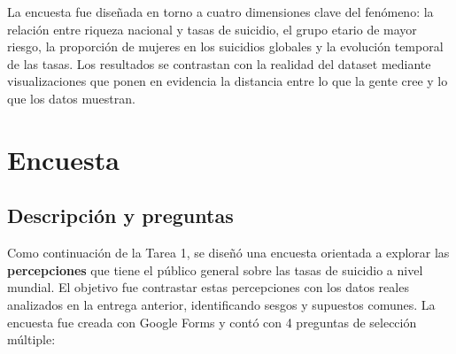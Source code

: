 \documentclass[12pt, letterpaper]{article}
\begin{document}
La encuesta fue diseñada en torno a cuatro dimensiones clave del fenómeno: la relación entre riqueza nacional y tasas de suicidio, el grupo etario de mayor riesgo, la proporción de mujeres en los suicidios globales y la evolución temporal de las tasas. Los resultados se contrastan con la realidad del dataset mediante visualizaciones que ponen en evidencia la distancia entre lo que la gente cree y lo que los datos muestran.

\section{Encuesta}

\subsection{Descripción y preguntas}

Como continuación de la Tarea 1, se diseñó una encuesta orientada a explorar las
\textbf{percepciones} que tiene el público general sobre las tasas de suicidio a nivel mundial.
El objetivo fue contrastar estas percepciones con los datos reales analizados en la entrega anterior,
identificando sesgos y supuestos comunes. La encuesta fue creada con Google Forms y contó con
4 preguntas de selección múltiple:
\end{document}
